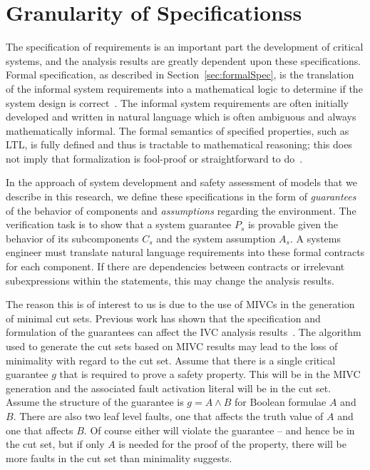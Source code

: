 \chapter{Granularity of Specificationss}
\label{chap:granularity}
The specification of requirements is an important part the development of critical systems, and the analysis results are greatly dependent upon these specifications. Formal specification, as described in Section~\ref{sec:formalSpec}, is the translation of the informal system requirements into a mathematical logic to determine if the system design is correct~\cite{hinchey2012industrial}. The informal system requirements are often initially developed and written in natural language which is often ambiguous and always mathematically informal. The formal semantics of specified properties, such as LTL, is fully defined and thus is tractable to mathematical reasoning; this does not imply that formalization is fool-proof or straightforward to do~\cite{kotonya1998requirements}. 

 In the approach of system development and safety assessment of models that we describe in this research, we define these specifications in the form of \emph{guarantees} of the behavior of components and \emph{assumptions} regarding the environment. The verification task is to show that a system guarantee $P_s$ is provable given the behavior of its subcomponents $C_s$ and the system assumption $A_s$. A systems engineer must translate natural language requirements into these formal contracts for each component. If there are dependencies between contracts or irrelevant subexpressions within the statements, this may change the analysis results. 
 
The reason this is of interest to us is due to the use of MIVCs in the generation of minimal cut sets. Previous work has shown that the specification and formulation of the guarantees can affect the IVC analysis results~\cite{ghassabani_2018}. The algorithm used to generate the cut sets based on MIVC results may lead to the loss of minimality with regard to the cut set.  Assume that there is a single critical guarantee $g$ that is required to prove a safety property. This will be in the MIVC generation and the associated fault activation literal will be in the cut set. Assume the structure of the guarantee is $g = A \land B$ for Boolean formulae $A$ and $B$. There are also two leaf level faults, one that affects the truth value of $A$ and one that affects $B$. Of course either will violate the guarantee -- and hence be in the cut set, but if only $A$ is needed for the proof of the property, there will be more faults in the cut set than minimality suggests. 

